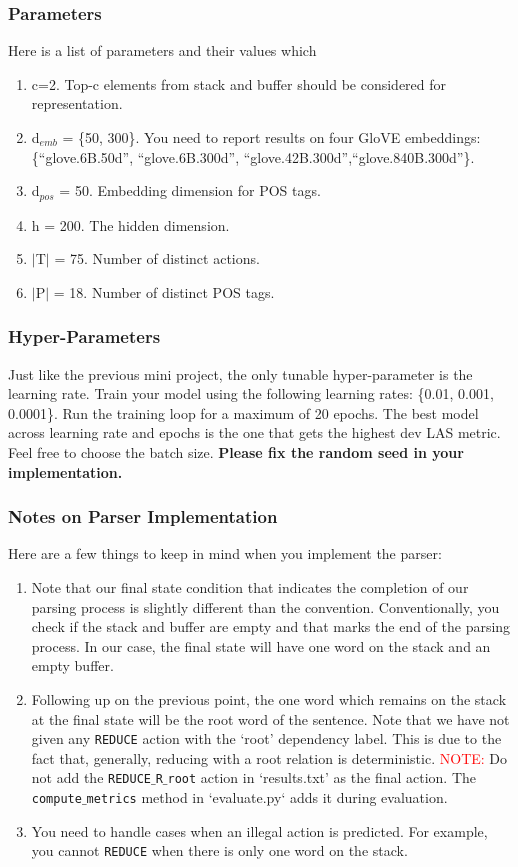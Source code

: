  \subsubsection{Parameters}
 Here is a list of parameters and their values which 
 \begin{enumerate}
     \item c=2. Top-c elements from stack and buffer should be considered for representation. 
     \item d$_{emb}$ = \{50, 300\}. You need to report results on four GloVE embeddings: \{``glove.6B.50d'', ``glove.6B.300d'', ``glove.42B.300d'',``glove.840B.300d''\}. 
     \item d$_{pos}$ = 50. Embedding dimension for POS tags.
     \item h = 200. The hidden dimension.
     \item $|$T$|$ = 75. Number of distinct actions.
     \item $|$P$|$ = 18. Number of distinct POS tags.
 \end{enumerate}


 \subsubsection{Hyper-Parameters}
Just like the previous mini project, the only tunable hyper-parameter is the learning rate. Train your model using the following learning rates: \{0.01, 0.001, 0.0001\}. Run the training loop for a maximum of 20 epochs. The best model across learning rate and epochs is the one that gets the highest dev LAS metric. Feel free to choose the batch size. \textbf{Please fix the random seed in your implementation.}

\subsubsection{Notes on Parser Implementation}
Here are a few things to keep in mind when you implement the parser:
\begin{enumerate}
    \item Note that our final state condition that indicates the completion of our parsing process is slightly different than the convention. Conventionally, you check if the stack and buffer are empty and that marks the end of the parsing process. In our case, the final state will have one word on the stack and an empty buffer. 
    \item Following up on the previous point, the one word which remains on the stack at the final state will be the root word of the sentence. Note that we have not given any \texttt{REDUCE} action with the `root' dependency label. This is due to the fact that, generally, reducing with a root relation is deterministic. \textcolor{red}{NOTE:} Do not add the \texttt{REDUCE$\_$R$\_$root} action in `results.txt' as the final action. The \texttt{compute$\_$metrics} method in `evaluate.py` adds it during evaluation.    
    \item You need to handle cases when an illegal action is predicted. For example, you cannot \texttt{REDUCE} when there is only one word on the stack.
\end{enumerate}


